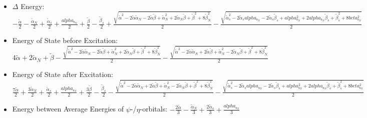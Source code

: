 \documentclass[12pt,a4paper]{article}
\begin{document}
\begin{itemize}
                \item $\Delta$ Energy: $- \frac{\tilde{\alpha}}{2} - \frac{\tilde{\alpha}_{N}}{2} + \frac{\tilde{\alpha}_{s}}{2} + \frac{alpha_{\text{s}_N}}{2} + \frac{\tilde{\beta}}{2} - \frac{\tilde{\beta}_{s}}{2} + \frac{\sqrt{\tilde{\alpha}^{2} - 2 \tilde{\alpha} \tilde{\alpha}_{N} - 2 \tilde{\alpha} \tilde{\beta} + \tilde{\alpha}_{N}^{2} + 2 \tilde{\alpha}_{N} \tilde{\beta} + \tilde{\beta}^{2} + 8 \tilde{\beta}_{N}^{2}}}{2} - \frac{\sqrt{\tilde{\alpha}_{s}^{2} - 2 \tilde{\alpha}_{s} alpha_{\text{s}_N} - 2 \tilde{\alpha}_{s} \tilde{\beta}_{s} + alpha_{\text{s}_N}^{2} + 2 alpha_{\text{s}_N} \tilde{\beta}_{s} + \tilde{\beta}_{s}^{2} + 8 beta_{\text{s}_N}^{2}}}{2}$
                \item Energy of State before Excitation: $4 \tilde{\alpha} + 2 \tilde{\alpha}_{N} + \tilde{\beta} - \frac{\sqrt{\tilde{\alpha}^{2} - 2 \tilde{\alpha} \tilde{\alpha}_{N} - 2 \tilde{\alpha} \tilde{\beta} + \tilde{\alpha}_{N}^{2} + 2 \tilde{\alpha}_{N} \tilde{\beta} + \tilde{\beta}^{2} + 8 \tilde{\beta}_{N}^{2}}}{2} - \frac{\sqrt{\tilde{\alpha}^{2} - 2 \tilde{\alpha} \tilde{\alpha}_{N} + 2 \tilde{\alpha} \tilde{\beta} + \tilde{\alpha}_{N}^{2} - 2 \tilde{\alpha}_{N} \tilde{\beta} + \tilde{\beta}^{2} + 8 \tilde{\beta}_{N}^{2}}}{2}$
                \item Energy of State after Excitation: $\frac{7 \tilde{\alpha}}{2} + \frac{3 \tilde{\alpha}_{N}}{2} + \frac{\tilde{\alpha}_{s}}{2} + \frac{alpha_{\text{s}_N}}{2} + \frac{3 \tilde{\beta}}{2} - \frac{\tilde{\beta}_{s}}{2} - \frac{\sqrt{\tilde{\alpha}^{2} - 2 \tilde{\alpha} \tilde{\alpha}_{N} + 2 \tilde{\alpha} \tilde{\beta} + \tilde{\alpha}_{N}^{2} - 2 \tilde{\alpha}_{N} \tilde{\beta} + \tilde{\beta}^{2} + 8 \tilde{\beta}_{N}^{2}}}{2} - \frac{\sqrt{\tilde{\alpha}_{s}^{2} - 2 \tilde{\alpha}_{s} alpha_{\text{s}_N} - 2 \tilde{\alpha}_{s} \tilde{\beta}_{s} + alpha_{\text{s}_N}^{2} + 2 alpha_{\text{s}_N} \tilde{\beta}_{s} + \tilde{\beta}_{s}^{2} + 8 beta_{\text{s}_N}^{2}}}{2}$
                \item Energy between Average Energies of $\psi$-/$\eta$-orbitals: $- \frac{2 \tilde{\alpha}}{3} - \frac{\tilde{\alpha}_{N}}{3} + \frac{2 \tilde{\alpha}_{s}}{3} + \frac{alpha_{\text{s}_N}}{3}$
            

\end{itemize}
\end{document}
